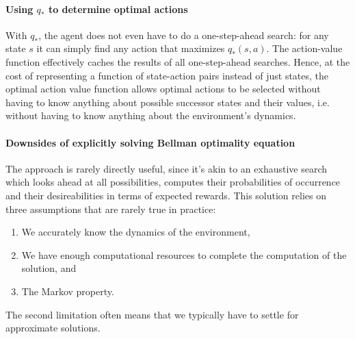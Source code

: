 \documentclass[12pt]{article}
\begin{document}
\paragraph{Using $q_*$ to determine optimal actions} With $q_*$, the agent does not even have to do a one-step-ahead search: for any state $s$ it can simply find any action that maximizes $q_*(s,a)$. The action-value function effectively caches the results of all one-step-ahead searches. Hence, at the cost of representing a function of state-action pairs instead of just states, the optimal action value function allows optimal actions to be selected without having to know anything about possible successor states and their values, i.e. without having to know anything about the environment's dynamics.

\paragraph{Downsides of explicitly solving Bellman optimality equation} The approach is rarely directly useful, since it's akin to an exhaustive search which looks ahead at all possibilities, computes their probabilities of occurrence and their desireabilities in terms of expected rewards. This solution relies on three assumptions that are rarely true in practice:
\begin{enumerate}
\item We accurately know the dynamics of the environment,
\item We have enough computational resources to complete the computation of the   solution, and
\item The Markov property.
\end{enumerate}
The second limitation often means that we typically have to settle for approximate solutions.
\end{document}
